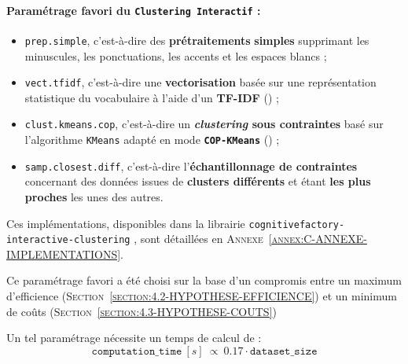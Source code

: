 		\setcounter{localCounterOfFootnoteValue}{\value{footnote}}
		\begin{leftBarImportantGreen}
			\paragraph{Paramétrage favori du \texttt{Clustering Interactif} :}
			\begin{itemize}
				\item \texttt{prep.simple}, c'est-à-dire des \textbf{prétraitements} \textbf{simples} supprimant les minuscules, les ponctuations, les accents et les espaces blancs ;
				\item \texttt{vect.tfidf}, c'est-à-dire une \textbf{vectorisation} basée sur une représentation statistique du vocabulaire à l'aide d'un \textbf{TF-IDF} (\cite{ramos:2003:using-tfidf-determine}) ;
				\item \texttt{clust.kmeans.cop}, c'est-à-dire un \textbf{\textit{clustering} sous contraintes} basé sur l'algorithme \texttt{KMeans} adapté en mode \textbf{\texttt{COP-KMeans}} (\cite{wagstaff-etal:2001:constrained-kmeans-clustering}) ;
				\item \texttt{samp.closest.diff}, c'est-à-dire l'\textbf{échantillonnage de contraintes} concernant des données issues de \textbf{clusters différents} et étant \textbf{les plus proches} les unes des autres.
			\end{itemize}
			Ces implémentations, disponibles dans la librairie \texttt{cognitivefactory-interactive-clustering} \footnotemark, sont détaillées en \textsc{Annexe~\ref{annex:C-ANNEXE-IMPLEMENTATIONS}}.
		\end{leftBarImportantGreen}
			
		Ce paramétrage favori a été choisi sur la base d'un compromis entre un maximum d'efficience (\textsc{Section~\ref{section:4.2-HYPOTHESE-EFFICIENCE}}) et un minimum de coûts (\textsc{Section~\ref{section:4.3-HYPOTHESE-COUTS}})
			
		Un tel paramétrage nécessite un temps de calcul de :
		\begin{equation}
			\label{equation:5.4-GUIDE-PARAMETRAGES-ET-COUTS-TEMPS-CALCUL}
			\texttt{computation\_time}~[s]~\propto~0.17 \cdot \texttt{dataset\_size}
		\end{equation}
			
